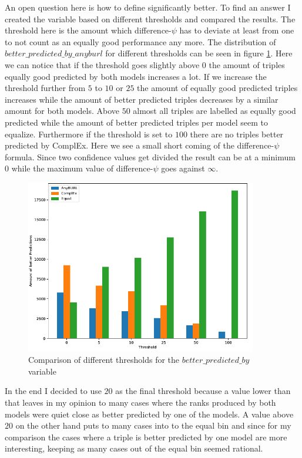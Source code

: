An open question here is how to define significantly better. To find an answer I created the variable based on different thresholds and compared the results. The threshold here is the amount which difference-$\psi$ has to deviate at least from one to not count as an equally good performance any more. The distribution of $better\_predicted\_by\_anyburl$ for different thresholds can be seen in figure \ref{fig:difference_psi_threshold_anyburl_complex_codex}. Here we can notice that if the threshold goes slightly above $0$ the amount of triples equally good predicted by both models increases a lot. If we increase the threshold further from $5$ to $10$ or $25$ the amount of equally good predicted triples increases while the amount of better predicted triples decreases by a similar amount for both models. Above $50$ almost all triples are labelled as equally good predicted while the amount of better predicted triples per model seem to equalize. Furthermore if the threshold is set to $100$ there are no triples better predicted by ComplEx. Here we see a small short coming of the difference-$\psi$ formula. Since two confidence values get divided the result can be at a minimum $0$ while the maximum value of difference-$\psi$ goes against $\infty$. 

\begin{figure}[H]
\centering
\includegraphics[width=0.9\textwidth]{images/difference_psi_threshold_anyburl_complex_codex.PNG}
\caption{Comparison of different thresholds for the $better\_predicted\_by$ variable}
\label{fig:difference_psi_threshold_anyburl_complex_codex}
\end{figure}

In the end I decided to use $20$ as the final threshold because a value lower than that leaves in my opinion to many cases where the ranks produced by both models were quiet close as better predicted by one of the models. A value above $20$ on the other hand puts to many cases into to the equal bin and since for my comparison the cases where a triple is better predicted by one model are more interesting, keeping as many cases out of the equal bin seemed rational. 

